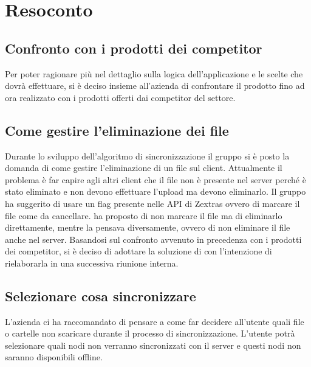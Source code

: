 \section{Resoconto}
\subsection{Confronto con i prodotti dei competitor}
Per poter ragionare più nel dettaglio sulla logica dell'applicazione e le scelte che dovrà effettuare, si è deciso insieme all'azienda di confrontare il prodotto fino ad ora realizzato con i prodotti offerti dai competitor del settore.

\subsection{Come gestire l'eliminazione dei file}
Durante lo sviluppo dell'algoritmo di sincronizzazione il gruppo si è posto la domanda di come gestire l'eliminazione di un file sul client. Attualmente il problema è far capire agli altri client che il file non è presente nel server perché è stato eliminato e non devono effettuare l'upload ma devono eliminarlo. Il gruppo ha suggerito di usare un flag presente nelle API di Zextras ovvero di marcare il file come 
da cancellare. \textit{\Federico{}} ha proposto di non marcare il file ma di eliminarlo direttamente, mentre \textit{\Alessio{}} la pensava diversamente, ovvero di non eliminare il file anche nel server. Basandosi sul confronto avvenuto in precedenza con i prodotti dei competitor, si è deciso di adottare la soluzione di \textit{\Federico{}} con l'intenzione di rielaborarla in una successiva riunione interna.

\subsection{Selezionare cosa sincronizzare}
L'azienda ci ha raccomandato di pensare a come far decidere all'utente quali file o cartelle non scaricare durante il processo di sincronizzazione.
L'utente potrà selezionare quali nodi non verranno sincronizzati con il server e questi nodi non saranno disponibili offline.

\newpage

